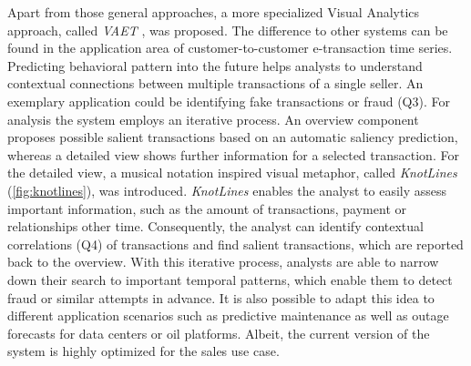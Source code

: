 \documentclass[electronic]{vgtc}             %
\begin{document}
Apart from those general approaches, a more specialized Visual Analytics approach, called \textit{VAET} \cite{Xie:2014}, was proposed.
The difference to other systems can be found in the application area of customer-to-customer e-transaction time series.
Predicting behavioral pattern into the future helps analysts to understand contextual connections between multiple transactions of a single seller.
An exemplary application could be identifying fake transactions or fraud (Q3).
For analysis the system employs an iterative process.
An overview component proposes possible salient transactions based on an automatic saliency prediction, whereas a detailed view shows further information for a selected transaction.
For the detailed view, a musical notation inspired visual metaphor, called \textit{KnotLines}  (\autoref{fig:knotlines}), was introduced.
\textit{KnotLines}  enables the analyst to easily assess important information, such as the amount of transactions, payment or relationships other time. 
Consequently, the analyst can identify contextual correlations (Q4) of transactions and find salient transactions, which are reported back to the overview. 
With this iterative process, analysts are able to narrow down their search to important temporal patterns, which enable them to detect fraud or similar attempts in advance. 
It is also possible to adapt this idea to different application scenarios such as predictive maintenance as well as outage forecasts for data centers or oil platforms.
Albeit, the current version of the system is highly optimized for the sales use case. 
\end{document}
